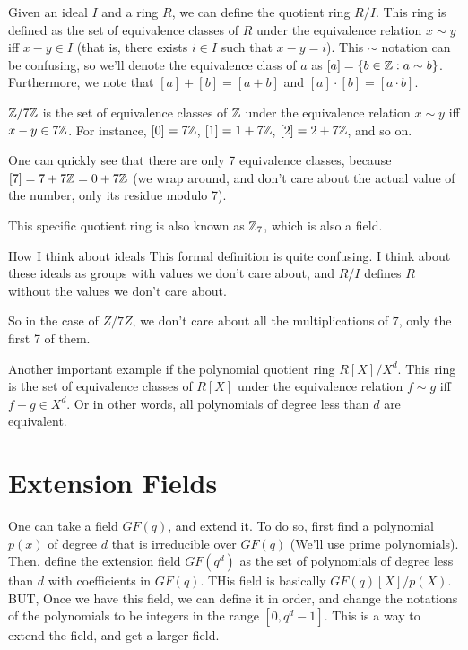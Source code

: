 Given an ideal $I$ and a ring $R$, we can define the quotient ring $R/I$.
This ring is defined as the set of equivalence classes of $R$ under the equivalence relation 
$x\sim y$ iff $x-y\in I$ (that is, there exists $i\in I$ such that $x-y=i$).
This $\sim$ notation can be confusing, so we'll denote the equivalence class of $a$ as $[a]=\{b\in \mathbb{Z} :a\sim b \}$.
Furthermore, we note that $[a]+[b]=[a+b]$ and $[a]\cdot[b]=[a\cdot b]$.

\begin{example}
    $\mathbb{Z}/7\mathbb{Z}$ is the set of equivalence classes of $\mathbb{Z}$ under the equivalence relation
    $x\sim y$ iff $x-y\in 7\mathbb{Z}$. 
    For instance, $[0]=7\mathbb{Z}$, $[1]=1+7\mathbb{Z}$, $[2]=2+7\mathbb{Z}$, and so on.

    One can quickly see that there are only 7 equivalence classes, because $[7]=7+7\mathbb{Z}=0+7\mathbb{Z}$ (we wrap around, 
    and don't care about the actual value of the number, only its residue modulo 7).

    This specific quotient ring is also known as $\mathbb{Z}_7$, which is also a field.
\end{example}


\begin{bclogo}[logo=\bcinfo, couleurBarre=orange, noborder=true, couleur=white]{How I think about ideals}
    This formal definition is quite confusing. I think about these ideals as groups 
    with values we don't care about, and $R/I$ defines $R$ without 
    the values we don't care about.

    So in the case of $Z/7Z$, we don't care about 
    all the multiplications of $7$, only the first 7 of them.
\end{bclogo}


Another important example if the polynomial quotient ring $R[X]/X^d$. 
This ring is the set of equivalence classes of $R[X]$ under the equivalence relation
$f\sim g$ iff $f-g\in X^d$. Or in other words, all polynomials of degree less than $d$ are equivalent.


\section{Extension Fields}

One can take a field $GF(q)$, and extend it.
To do so, first find a polynomial $p(x)$ of degree $d$ that is irreducible over $GF(q)$
(We'll use prime polynomials).
Then, define the extension field $GF(q^d)$ as the set of polynomials of degree less than $d$ with coefficients in $GF(q)$.
THis field is basically $GF(q)[X]/p(X)$. BUT, Once we have this field, 
we can define it in order, and change the notations of the polynomials to be integers 
in the range $[0,q^d-1]$. This is a way to extend the field, and get a larger field.


